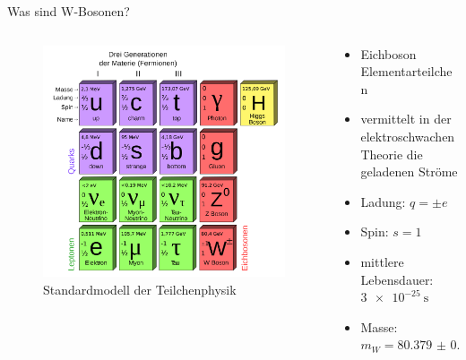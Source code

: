 \documentclass[aspectratio=1610, 9pt]{beamer}
\begin{document}
\begin{frame}{Was sind W-Bosonen?}
  \begin{columns}
    \begin{column}{0.4\textwidth}
      \begin{figure}
        \includegraphics[width=\textwidth]{images/standard_model.png}
        \caption{Standardmodell der Teilchenphysik \cite{standard_model}}
      \end{figure}
    \end{column}
    \begin{column}{0.4\textwidth}
      \begin{itemize}
        \item Eichboson \rightarrow Elementarteilchen
        \item vermittelt in der elektroschwachen Theorie die geladenen Ströme
        \item Ladung: $q = \pm e$
        \item Spin: $s = 1$
        \item mittlere Lebensdauer: $\SI{3e-25}{\s}$
        \item Masse: $m_W = \SI{80.379(12)}{\GeV}$
      \end{itemize}
    \end{column}
  \end{columns}
\end{frame}
\end{document}
